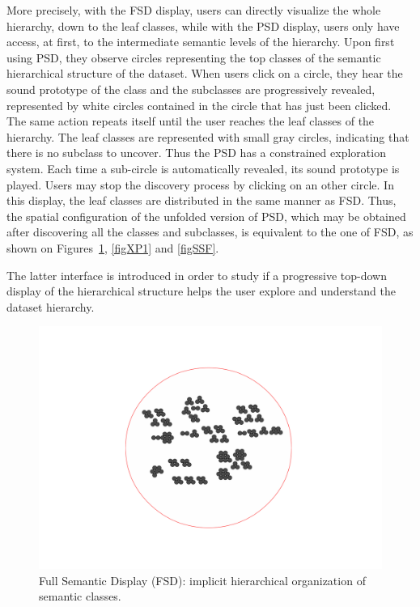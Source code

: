 \documentclass{aes2e}
\begin{document}
More precisely, with the FSD display, users can directly visualize the whole hierarchy, down to the leaf classes, while with the PSD display, users only have access, at first, to the intermediate semantic levels of the hierarchy. Upon first using PSD, they observe circles representing the top classes of the semantic hierarchical structure of the dataset. When users click on a circle, they hear the sound prototype of the class and the subclasses are progressively revealed, represented by white circles contained in the circle that has just been clicked. The same action repeats itself until the user reaches the leaf classes of the hierarchy. The leaf classes are represented with small gray circles, indicating that there is no subclass to uncover. Thus the PSD has a constrained exploration system. Each time a sub-circle is automatically revealed, its sound prototype is played. Users may stop the discovery process by clicking on an other circle. In this display, the leaf classes are distributed  in the same manner as FSD. Thus, the spatial configuration of the unfolded version of PSD, which may be obtained after discovering all the classes and subclasses, is equivalent to the one of FSD, as shown on Figures~\ref{figXP2}, \ref{figXP1} and \ref{figSSF}.

The latter interface is introduced in order to study if a progressive top-down display of the hierarchical structure helps the user explore and understand the dataset hierarchy.

\begin{figure}[t!]
\begin{center}
\includegraphics[scale=0.30]{gfx/XP2clean.pdf} 
\end{center}
\caption{\label{figXP2} Full Semantic Display (FSD): implicit hierarchical organization of semantic classes.}
\end{figure}
\end{document}
